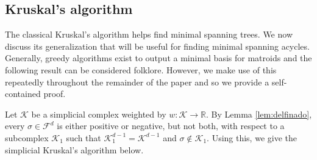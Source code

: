 \documentclass[12pt]{amsart}
\newcommand{\red}[1]{\textcolor{red}{#1}}
\newcommand{\gt}[1]{\textcolor{blue}{#1}}
\newcommand{\remove}[1]{}
\renewcommand{\red}[1]{#1}
\renewcommand{\gt}[1]{#1}
\numberwithin{equation}{section}
\numberwithin{theorem}{section}
\newcommand{\Real}{\mathbb R}
\newcommand{\1}{\mathbf{1}}
\def\F{\mathcal{F}}
\def\K{\mathcal{K}}
\begin{document}
\subsection{Kruskal's algorithm}
\label{sec:algos}
\gt{The classical Kruskal's \cite{Kruskal56} algorithm helps find minimal spanning trees. We now discuss its generalization that will be useful for finding minimal spanning acycles.}
\remove{We now turn to generalizing  Kruskal's algorithm  for minimal spanning trees.} \red{Generally, greedy algorithms exist to output a minimal basis for matroids \cite[Chapter 19]{Welsh76} and the following result can be considered folklore. However, we make use of this repeatedly throughout the remainder of the paper and so we provide a self-contained proof.} 
%	

Let $\K$ be a simplicial complex weighted by $w: \K \to \Real.$ By Lemma \ref{lem:delfinado}, every $\sigma \in \F^d$ is either positive or negative, but not both, with respect to a subcomplex $\K_1$ such that $\K_1^{d - 1} = \K^{d - 1}$ and $\sigma \notin \K_1$. Using this, we give the simplicial Kruskal's algorithm below.
\end{document}
